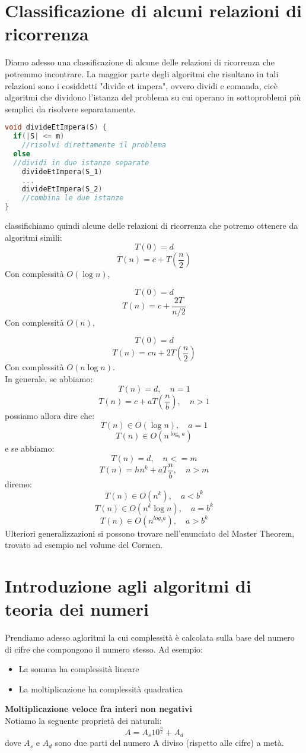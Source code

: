 \documentclass[a4paper,12pt]{article}
\begin{document}
\section{Classificazione di alcuni relazioni di ricorrenza}
Diamo adesso una classificazione di alcune delle relazioni di ricorrenza che potremmo incontrare. La maggior parte
degli algoritmi che risultano in tali relazioni sono i cosiddetti "divide et impera", ovvero dividi e comanda, cieè algoritmi
che dividono l'istanza del problema su cui operano in sottoproblemi più semplici da risolvere separatamente.
\begin{lstlisting}[language=C++]
void divideEtImpera(S) {
  if(|S| <= m)
    //risolvi direttamente il problema
  else
  //dividi in due istanze separate
    divideEtImpera(S_1)
    ...
    divideEtImpera(S_2)
    //combina le due istanze
}
\end{lstlisting}
classifichiamo quindi alcune delle relazioni di ricorrenza che potremo ottenere da algoritmi simili:
$$ T(0) = d $$
$$ T(n) = c + T(\frac{n}{2}) $$
Con complessità $O(\log{n})$,
\par\smallskip
$$ T(0) = d $$
$$ T(n) = c + \frac{2T}{n / 2} $$
Con complessità $O(n)$,
\par\smallskip
$$ T(0) = d $$
$$ T(n) = cn + 2T(\frac{n}{2}) $$
Con complessità $ O(n\log{n}) $. \\
In generale, se abbiamo:
$$ T(n) = d, \quad n = 1 $$
$$ T(n) = c + aT(\frac{n}{b}), \quad n > 1 $$
possiamo allora dire che:
$$ T(n) \in O(\log{n}), \quad a = 1 $$
$$ T(n) \in O(n^{\log_b{a}})$$
e se abbiamo:
$$ T(n) = d, \quad n <= m $$
$$ T(n) = hn^k + aT \frac{n}{b},\quad n > m $$
diremo:
$$ T(n) \in O(n^k), \quad a < b^k $$
$$ T(n) \in O(n^k \log{n}), \quad a = b^k $$
$$ T(n) \in O(n^{log_b{a}}), \quad a > b^k $$
Ulteriori generalizzazioni si possono trovare nell'enunciato del Master Theorem, trovato ad esempio nel volume del Cormen. 

\section{Introduzione agli algoritmi di teoria dei numeri}
Prendiamo adesso agloritmi la cui complessità è calcolata sulla base del numero di cifre che compongono il numero stesso.
Ad esempio:
\begin{itemize}
  \item La somma ha complessità lineare
  \item La moltiplicazione ha complessità quadratica
\end{itemize}

\par\smallskip
\textbf{Moltiplicazione veloce fra interi non negativi} \\
Notiamo la seguente proprietà dei naturali:
$$ A = A_s {10}^{\frac{n}{2}} + A_d$$
dove $A_s$  e $A_d$ sono due parti del numero A diviso (rispetto alle cifre) a metà.
\end{document}
